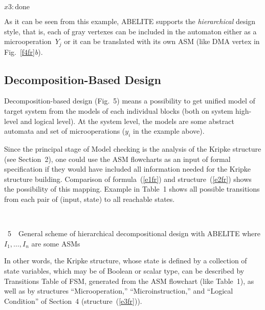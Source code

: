 \begin{multicols}{2}
   $x3  : \mathrm{done}$ 
   
   \smallskip
   
As it can be seen from this example, ABELITE supports the \textit{hierarchical} design 
style, that is, each of gray vertexes can be included in the automaton either as a 
microoperation~$Y_j$ or it can be translated with its own ASM (like DMA vertex in 
Fig.~\ref{f4fr}\textit{b}).     
       
\subsection{Decomposition-Based Design}

\noindent
Decomposition-based design (Fig.~5) means a possibility to get unified model of 
target system from the models of each individual blocks (both on system high-level and logical 
level). At the system level, the models are some abstract automata and set of microoperations 
($y_i$ in the example above).
                         


Since the principal stage of Model checking is the analysis of the Kripke structure (see 
Section~2), one could use the ASM flowcharts as an input of formal specification if they would 
have included all information needed for the Kripke structure building. Comparison of 
formula~(\ref{e1fr}) and structure~(\ref{e2fr}) shows the possibility of this mapping. Example in 
Table~1 shows all possible transitions from each pair of (input, state) to all reachable 
states.    

\begin{center} %
\vspace*{6pt}
\mbox{%
\epsfxsize=78.788mm
}
\end{center}
\vspace*{-6pt}
\begin{center}
{{\figurename~5}\ \ \small{General scheme of hierarchical decompositional design with ABELITE
where $I_1, \ldots , I_n$  are some ASMs}}
\end{center}
\vspace*{6pt}

\bigskip
\addtocounter{figure}{1}


In other words, the Kripke structure, whose state is defined by a collection of state variables, 
which may be of Boolean or scalar type, can be described by Transitions Table of FSM, 
generated from the ASM flowchart (like Table~1), as well as by structures ``Microoperation,'' 
``Microinstruction,'' and ``Logical Condition'' of Section~4 (structure~(\ref{e3fr})).   


\end{multicols}
